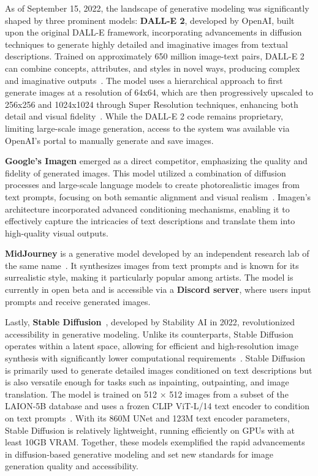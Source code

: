 \documentclass[12pt,DIV14,BCOR12mm,a4paper,footinclude=false,headinclude,parskip=half-,twoside,openright,cleardoublepage=empty,toc=index,bibliography=totoc,listof=totoc]{scrreprt}
\numberwithin{equation}{chapter}
\begin{document}
As of September 15, 2022, the landscape of generative modeling was significantly shaped by three prominent models: \textbf{DALL-E 2}, developed by OpenAI, built upon the original DALL-E framework, incorporating advancements in diffusion techniques to generate highly detailed and imaginative images from textual descriptions. Trained on approximately 650 million image-text pairs, DALL-E 2 can combine concepts, attributes, and styles in novel ways, producing complex and imaginative outputs~\cite{openai2022_dalle2}. The model uses a hierarchical approach to first generate images at a resolution of 64x64, which are then progressively upscaled to 256x256 and 1024x1024 through Super Resolution techniques, enhancing both detail and visual fidelity~\cite{ramesh2022hierarchical}. While the DALL-E 2 code remains proprietary, limiting large-scale image generation, access to the system was available via OpenAI’s portal to manually generate and save images.

\textbf{Google's Imagen} emerged as a direct competitor, emphasizing the quality and fidelity of generated images. This model utilized a combination of diffusion processes and large-scale language models to create photorealistic images from text prompts, focusing on both semantic alignment and visual realism~\cite{IMAGEN}. Imagen's architecture incorporated advanced conditioning mechanisms, enabling it to effectively capture the intricacies of text descriptions and translate them into high-quality visual outputs.

\textbf{MidJourney} is a generative model developed by an independent research lab of the same name~\cite{midjourney2022}. It synthesizes images from text prompts and is known for its surrealistic style, making it particularly popular among artists. The model is currently in open beta and is accessible via a \textbf{Discord server}, where users input prompts and receive generated images.

Lastly, \textbf{Stable Diffusion}~\cite{rando2022red}, developed by Stability AI in 2022, revolutionized accessibility in generative modeling. Unlike its counterparts, Stable Diffusion operates within a latent space, allowing for efficient and high-resolution image synthesis with significantly lower computational requirements~\cite{Latent_Diffusion}. Stable Diffusion is primarily used to generate detailed images conditioned on text descriptions but is also versatile enough for tasks such as inpainting, outpainting, and image translation. The model is trained on 512 × 512 images from a subset of the LAION-5B database and uses a frozen CLIP ViT-L/14 text encoder to condition on text prompts~\cite{stable_diffusion}. With its 860M UNet and 123M text encoder parameters, Stable Diffusion is relatively lightweight, running efficiently on GPUs with at least 10GB VRAM. Together, these models exemplified the rapid advancements in diffusion-based generative modeling and set new standards for image generation quality and accessibility.
\end{document}
